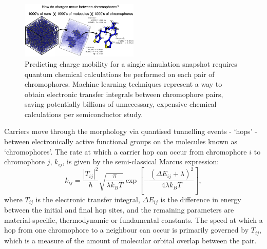 \documentclass[12pt]{article}
\begin{document}
\clearpage
\begin{figure}\centering
	\includegraphics[width=0.5\textwidth]{Figures/fig.png}
    \caption{Predicting charge mobility for a single simulation snapshot requires quantum chemical calculations be performed on each pair of chromophores. Machine learning techniques represent a way to obtain electronic transfer integrals between chromophore pairs, saving potentially billions of unnecessary, expensive chemical calculations per semiconductor study.}
	\label{fig:fig1}
\end{figure}

Carriers move through the morphology via quantised tunnelling events - `hops' - between electronically active functional groups on the molecules known as `chromophores'.
The rate at which a carrier hop can occur from chromophore $i$ to chromophore $j$, $k_{ij}$, is given by the semi-classical Marcus expression\cite{Marcus1964}:
\begin{equation}\label{eq:Marcus}
    k_{ij} = \frac{\left| T_{ij} \right|^{2}}{\hbar} \sqrt{\frac{\pi}{\lambda k_{B} T}} \exp \left[ - \frac{(\Delta E_{ij} + \lambda)^{2}}{4 \lambda k_{B} T} \right],
\end{equation}
where $T_{ij}$ is the electronic transfer integral, $\Delta E_{ij}$ is the difference in energy between the initial and final hop sites, and the remaining parameters are material-specific, thermodynamic or fundamental constants.
The speed at which a hop from one chromophore to a neighbour can occur is primarily governed by $T_{ij}$, which is a measure of the amount of molecular orbital overlap between the pair.
\end{document}
